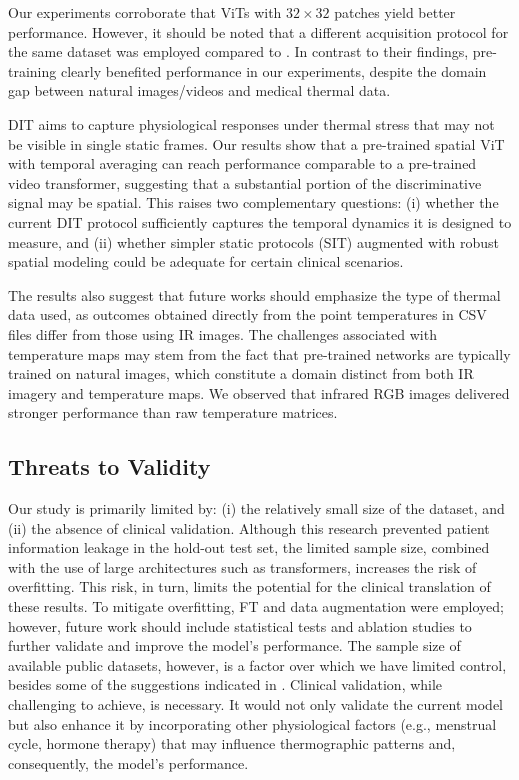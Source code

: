 \documentclass[runningheads]{llncs}
\begin{document}
Our experiments corroborate that \ac{ViTs} with $32 \times 32$ patches
yield better performance. However, it should be noted that a different
acquisition protocol for the same dataset was employed compared to
\cite{Garia2023}. In contrast to their findings, pre-training clearly
benefited performance in our experiments, despite the domain gap between
natural images/videos and medical thermal data.

\ac{DIT} aims to capture physiological responses under thermal stress
that may not be visible in single static frames. Our results show that
a pre-trained spatial \ac{ViT} with temporal averaging can reach
performance comparable to a pre-trained video transformer, suggesting
that a substantial portion of the discriminative signal may be
spatial. This raises two complementary questions: (i) whether the
current \ac{DIT} protocol sufficiently captures the
temporal dynamics it is designed to measure, and (ii) whether simpler
static protocols (\ac{SIT}) augmented with robust spatial modeling could be
adequate for certain clinical scenarios.

The results also suggest that future works should emphasize the type
of thermal data used, as outcomes obtained directly from the point
temperatures in CSV files differ from those using \ac{IR} images. The
challenges associated with temperature maps may stem from the fact
that pre-trained networks are typically trained on natural images,
which constitute a domain distinct from both \ac{IR} imagery and
temperature maps. We observed that infrared RGB images delivered
stronger performance than raw temperature matrices.

\subsection{Threats to Validity}
\label{sec:threats-validity}

Our study is primarily limited by: (i) the relatively small size of
the dataset, and (ii) the absence of clinical validation. Although
this research prevented patient information leakage in the hold-out
test set, the limited sample size, combined with the use of large
architectures such as transformers, increases the risk of
overfitting. This risk, in turn, limits the potential for the clinical
translation of these results. To mitigate overfitting, \ac{FT} and
data augmentation were employed; however, future work should include
statistical tests and ablation studies to further validate and improve
the model's performance. The sample size of available public datasets,
however, is a factor over which we have limited control, besides some
of the suggestions indicated in \cite{Ryan2025}. Clinical validation,
while challenging to achieve, is necessary. It would not only validate
the current model but also enhance it by incorporating other
physiological factors (e.g., menstrual cycle, hormone therapy) that
may influence thermographic patterns and, consequently, the model's
performance.
\end{document}
